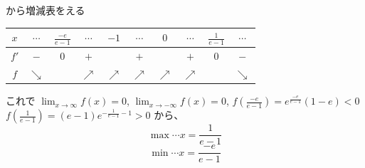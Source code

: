 \documentclass[../main.tex]{subfiles}
\begin{document}
から増減表をえる
\begin{center}
  \begin{tabular}{|c|c|c|c|c|c|c|c|c|c|}
    \hline
    $x$ & $\cdots$ & $\frac{-e}{e-1}$ & $\cdots$ & $-1$ & $\cdots$ & $0$ & $\cdots$ & $\frac{1}{e-1}$ & $\cdots$ \\
    \hline
    $f'$ & $-$ & $0$ & $+$ & & $+$ & & $+$ & $0$ & $-$ \\
    \hline
    $f$ & $\searrow$ & & $\nearrow$ & $\nearrow$ & $\nearrow$ & $\nearrow$ & $\nearrow$ & & $\searrow$ \\
    \hline
  \end{tabular}
\end{center}

これで $\lim_{x \to \infty} f(x) = 0$, $\lim_{x \to -\infty} f(x) = 0$, $f\left(\frac{-e}{e-1}\right) = e^{\frac{-e}{e-1}}(1-e) < 0$
$f\left(\frac{1}{e-1}\right) = (e-1) e^{-\frac{1}{e-1}-1} > 0$ から、
$$ \max \cdots x = \frac{1}{e-1} $$
$$ \min \cdots x = \frac{-e}{e-1} $$
\end{document}
